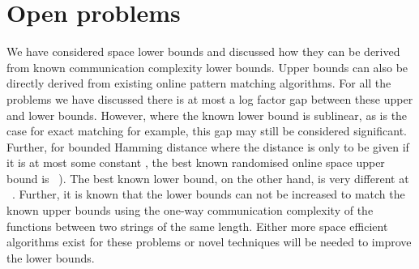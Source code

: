 \documentclass{article}
\theoremstyle{plain}
\theoremstyle{definition}
\begin{document}
\section{Open problems}

We have considered space lower bounds and discussed how they can be derived from known communication complexity lower bounds.  Upper bounds can also be directly derived from existing online pattern matching algorithms.  For all the problems we have discussed there is at most a log factor gap between these upper and lower bounds.  However, where the known lower bound is sublinear, as is the case for exact matching for example, this gap may still be considered significant. Further, for bounded Hamming distance where the distance is only to be given if it is at most some constant , the best known randomised online space upper bound is ~\cite{Porat:09}).  The best known lower bound, on the other hand, is very different at ~\cite{HSZZ:06}.  Further, it is known that the lower bounds can not be increased to match the known upper bounds using the one-way communication complexity of the functions between two strings of the same length. Either more space efficient algorithms exist for these problems or novel techniques will be needed to improve the lower bounds.



\end{document}
